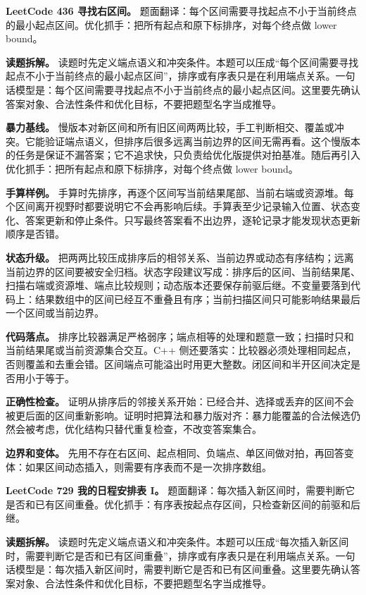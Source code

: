\noindent\textbf{LeetCode 436 寻找右区间。} 题面翻译：每个区间需要寻找起点不小于当前终点的最小起点区间。优化抓手：把所有起点和原下标排序，对每个终点做 lower bound。

\textbf{读题拆解。} 读题时先定义端点语义和冲突条件。本题可以压成“每个区间需要寻找起点不小于当前终点的最小起点区间”，排序或有序表只是在利用端点关系。一句话模型是：每个区间需要寻找起点不小于当前终点的最小起点区间。这里要先确认答案对象、合法性条件和优化目标，不要把题型名字当成推导。

\textbf{暴力基线。} 慢版本对新区间和所有旧区间两两比较，手工判断相交、覆盖或冲突。它能验证端点语义，但排序后很多远离当前边界的区间无需再看。这个慢版本的任务是保证不漏答案；它不追求快，只负责给优化版提供对拍基准。随后再引入优化抓手：把所有起点和原下标排序，对每个终点做 lower bound。

\textbf{手算样例。} 手算时先排序，再逐个区间写当前结果尾部、当前右端或资源堆。每个区间离开视野时都要说明它不会再影响后续。手算表至少记录输入位置、状态变化、答案更新和停止条件。只写最终答案看不出边界，逐轮记录才能发现状态更新顺序是否错。

\textbf{状态升级。} 把两两比较压成排序后的相邻关系、当前边界或动态有序结构；远离当前边界的区间要被安全归档。状态字段建议写成：排序后的区间、当前结果尾、扫描右端或资源堆、端点比较规则；动态版本还要保存前驱后继。不变量要落到代码上：结果数组中的区间已经互不重叠且有序；当前扫描区间只可能影响结果最后一个区间或当前边界。

\textbf{代码落点。} 排序比较器满足严格弱序；端点相等的处理和题意一致；扫描时只和当前结果尾或当前资源集合交互。C++ 侧还要落实：比较器必须处理相同起点，否则覆盖和去重会错。区间端点可能溢出时用更大整数。闭区间和半开区间决定是否用小于等于。

\textbf{正确性检查。} 证明从排序后的邻接关系开始：已经合并、选择或丢弃的区间不会被更后面的区间重新影响。证明时把算法和暴力版对齐：暴力能覆盖的合法候选仍然会被考虑，优化结构只替代重复检查，不改变答案集合。

\textbf{边界和变体。} 先用不存在右区间、起点相同、负端点、单区间做对拍，再回答变体：如果区间动态插入，则需要有序表而不是一次排序数组。

\noindent\textbf{LeetCode 729 我的日程安排表 I。} 题面翻译：每次插入新区间时，需要判断它是否和已有区间重叠。优化抓手：有序表按起点存区间，只检查新区间的前驱和后继。

\textbf{读题拆解。} 读题时先定义端点语义和冲突条件。本题可以压成“每次插入新区间时，需要判断它是否和已有区间重叠”，排序或有序表只是在利用端点关系。一句话模型是：每次插入新区间时，需要判断它是否和已有区间重叠。这里要先确认答案对象、合法性条件和优化目标，不要把题型名字当成推导。


